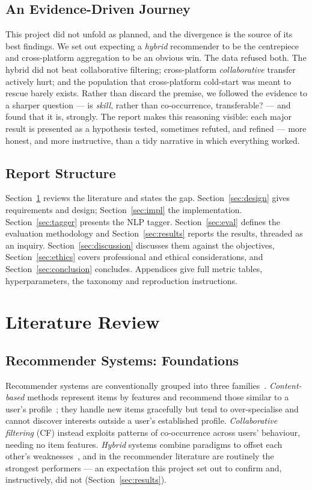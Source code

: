 \documentclass[12pt,a4paper]{article}
\begin{document}
\subsection{An Evidence-Driven Journey}
\label{sec:journey}
This project did not unfold as planned, and the divergence is the source of its best
findings. We set out expecting a \emph{hybrid} recommender to be the centrepiece and
cross-platform aggregation to be an obvious win. The data refused both. The hybrid did
not beat collaborative filtering; cross-platform \emph{collaborative} transfer actively
hurt; and the population that cross-platform cold-start was meant to rescue barely
exists. Rather than discard the premise, we followed the evidence to a sharper question
--- is \emph{skill}, rather than co-occurrence, transferable? --- and found that it is,
strongly. The report makes this reasoning visible: each major result is presented as a
hypothesis tested, sometimes refuted, and refined --- more honest, and more instructive,
than a tidy narrative in which everything worked.

\subsection{Report Structure}
Section~\ref{sec:lit} reviews the literature and states the gap. Section~\ref{sec:design}
gives requirements and design; Section~\ref{sec:impl} the implementation.
Section~\ref{sec:tagger} presents the NLP tagger. Section~\ref{sec:eval} defines the
evaluation methodology and Section~\ref{sec:results} reports the results, threaded as an
inquiry. Section~\ref{sec:discussion} discusses them against the objectives,
Section~\ref{sec:ethics} covers professional and ethical considerations, and
Section~\ref{sec:conclusion} concludes. Appendices give full metric tables,
hyperparameters, the taxonomy and reproduction instructions.

\section[Literature Review \textnormal{\small(1,378 words)}]{Literature Review}
\label{sec:lit}

\subsection{Recommender Systems: Foundations}
Recommender systems are conventionally grouped into three families~\cite{ricci2015}.
\emph{Content-based} methods represent items by features and recommend those similar to
a user's profile~\cite{lops2011}; they handle new items gracefully but tend to
over-specialise and cannot discover interests outside a user's established profile.
\emph{Collaborative filtering} (CF) instead exploits patterns of co-occurrence across
users' behaviour, needing no item features. \emph{Hybrid} systems combine paradigms to
offset each other's weaknesses~\cite{burke2002}, and in the recommender literature are
routinely the strongest performers --- an expectation this project set out to confirm
and, instructively, did not (Section~\ref{sec:results}).
\end{document}
